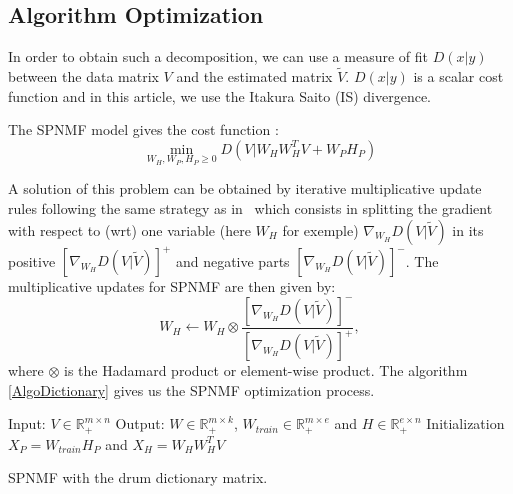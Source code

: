 \documentclass{article}
\begin{document}
\subsection{Algorithm Optimization}

In order to obtain such a decomposition, we can use a measure of fit $D(x|y)$ between the data matrix $V$ and the estimated matrix $\tilde{V}$. $D(x|y)$ is a scalar cost function and in this article, we use the Itakura Saito (IS) divergence.



The SPNMF model gives the cost function : 
\begin{equation}\label{InitCost}
\min_{W_H,W_P,H_P \geq 0} D(V|W_{H}W_{H}^{T}V + W_{P} H_{P})  
\end{equation}

A solution of this problem can be obtained by iterative multiplicative update rules following the same strategy as in~\cite{yuanOja2005,Lee01algorithmsfor} which consists in splitting the gradient with respect to (wrt) one variable (here $W_H$ for exemple) $\nabla_{W_H} D(V|\tilde{V})$ in its positive $[\nabla_{W_H} D(V|\tilde{V})]^{+}$ and negative parts $[\nabla_{W_H} D(V|\tilde{V})]^{-}$.
The multiplicative updates for SPNMF are then given by: 
$$W_{H} \leftarrow W_{H} \otimes \frac{ [\nabla_{W_H} D(V|\tilde{V})]^{-} }{[\nabla_{W_H} D(V|\tilde{V})]^{+}}, $$
where $\otimes$ is the Hadamard product or element-wise product. The algorithm \ref{AlgoDictionary} gives us the SPNMF optimization process.
 
\begin{algorithm}[h]
 Input: $V \in \mathbb{R}_{+}^{m \times n} $
 Output: $W \in \mathbb{R}_{+}^{m \times k}$, $W_{train} \in \mathbb{R}_+^{m \times e}$ and $H \in \mathbb{R}_{+}^{e \times n}$
 Initialization\;
 $ X_P = W_{train}H_P $ and
 $ X_H = W_HW_H^TV $ 
  
\vspace{0.2cm}
 \caption{SPNMF with the drum dictionary matrix.}\label{AlgoDictionary}
\end{algorithm}
\end{document}
